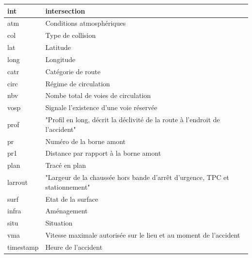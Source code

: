 \documentclass[french]{article}
\begin{document}
\begin{table}[!ht]
\begin{tabular}{|l|l|}
        int & intersection \\ \hline
        atm & Conditions atmosphériques \\ \hline
        col & Type de collision \\ \hline
        lat & Latitude \\ \hline
        long & Longitude \\ \hline
        catr & Catégorie de route \\ \hline
        circ & Régime de circulation \\ \hline
        nbv & Nombe total de voies de circulation \\ \hline
        vosp & Signale l’existence d’une voie réservée \\ \hline
        prof & "Profil en long, décrit la déclivité de la route à l’endroit de l’accident" \\ \hline
        pr & Numéro de la borne amont \\ \hline
        pr1 & Distance par rapport à la borne amont \\ \hline
        plan & Tracé en plan \\ \hline
        larrout & "Largeur de la chaussée hors bande d’arrêt d’urgence, TPC et stationnement" \\ \hline
        surf & Etat de la surface \\ \hline
        infra & Aménagement \\ \hline
        situ & Situation \\ \hline
        vma & Vitesse maximale autorisée sur le lieu et au moment de l’accident \\ \hline
        timestamp & Heure de l’accident \\ \hline
    \end{tabular}
\end{table}
\end{document}
